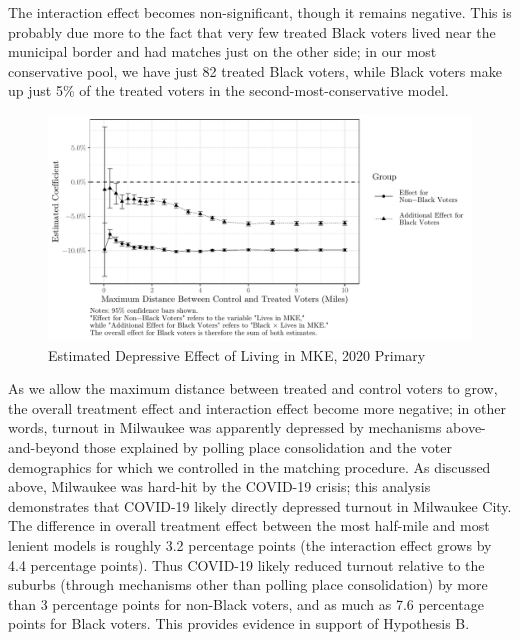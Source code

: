 \documentclass[
  12pt,
]{article}
\begin{document}
The interaction effect becomes non-significant, though it remains negative. This is probably due more to the fact that very few treated Black voters lived near the municipal border and had matches just on the other side; in our most conservative pool, we have just 82 treated Black voters, while Black voters make up just 5\% of the treated voters in the second-most-conservative model.

\begin{figure}[H]

{\centering \includegraphics{markdown_files/figure-latex/plot-1} 

}

\caption{\label{fig:coef-plot}Estimated Depressive Effect of Living in MKE, 2020 Primary}\label{fig:plot}
\end{figure}

As we allow the maximum distance between treated and control voters to grow, the overall treatment effect and interaction effect become more negative; in other words, turnout in Milwaukee was apparently depressed by mechanisms above-and-beyond those explained by polling place consolidation and the voter demographics for which we controlled in the matching procedure. As discussed above, Milwaukee was hard-hit by the COVID-19 crisis; this analysis demonstrates that COVID-19 likely directly depressed turnout in Milwaukee City. The difference in overall treatment effect between the most half-mile and most lenient models is roughly 3.2 percentage points (the interaction effect grows by 4.4 percentage points). Thus COVID-19 likely reduced turnout relative to the suburbs (through mechanisms other than polling place consolidation) by more than 3 percentage points for non-Black voters, and as much as 7.6 percentage points for Black voters. This provides evidence in support of Hypothesis B.

\newpage
\end{document}
